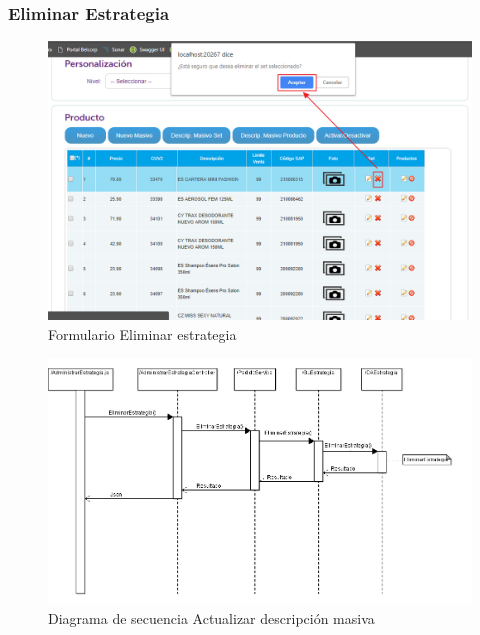 \documentclass[a4paper,11pt]{paper}
\begin{document}
\subsubsection{Eliminar Estrategia}
\begin{figure}[h]
\centering
\includegraphics[width=1.0\textwidth]{imgs/Estrategia/FormularioEliminarEstrategia.png}
\caption{Formulario Eliminar estrategia}
\end{figure}

\newpage
\begin{landscape}
\begin{figure}[!h]
\centering
\includegraphics[width=1.5\textwidth]{imgs/Estrategia/EliminarEstrategia.png}
\caption{Diagrama de secuencia Actualizar descripción masiva}
\end{figure}
\end{landscape} 


\newpage
\end{document}
